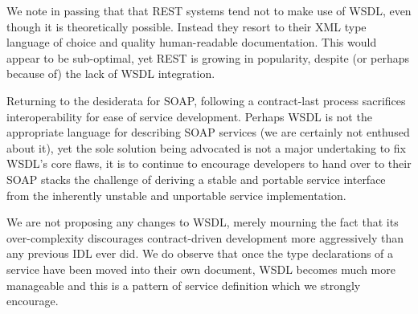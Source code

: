 We note in passing that that REST systems \cite{fielding:rest} tend not to
make use of WSDL, even though it is theoretically possible. Instead
they resort to their XML type language of choice and quality
human-readable documentation. This would appear to be sub-optimal, yet
REST is growing in popularity, despite (or perhaps because of) the
lack of WSDL integration.

Returning to the desiderata for SOAP, following a contract-last process
sacrifices interoperability for ease of service development. Perhaps
WSDL is not the appropriate language for describing SOAP services (we
are certainly not enthused about it), yet the sole solution being
advocated is not a major undertaking to fix WSDL's core flaws, it is
to continue to encourage developers to hand over to their SOAP stacks
the challenge of deriving a stable and portable service interface from
the inherently unstable and unportable service implementation.

We are not proposing any changes to WSDL, merely mourning the fact
that its over-complexity discourages contract-driven
development more aggressively than any previous IDL ever did. We do
observe that once the type declarations of a service have been moved
into their own document, WSDL becomes much more manageable and this is
a pattern of service definition which we strongly encourage.
